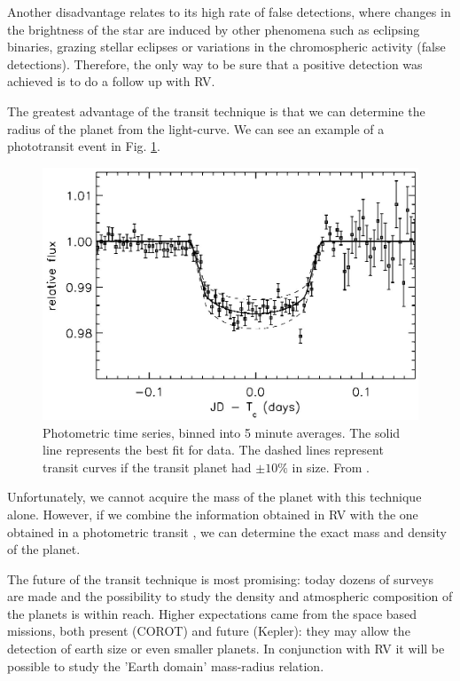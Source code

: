 \documentclass[dvips,12pt,a4paper]{report}
\begin{document}
Another disadvantage relates to its high rate of false detections, where changes in the brightness of the star are induced by other phenomena such as eclipsing binaries, grazing stellar eclipses or variations in the chromospheric activity (false detections). Therefore, the only way to be sure that a positive detection was achieved is to do a follow up with RV. 

The greatest advantage of the transit technique is that we can determine the radius of the planet from the light-curve. We can see an example of a phototransit event in Fig. \ref{photot}. 

\begin{figure}[h]
\centering
\includegraphics[trim=0cm 0.5cm 0cm 0.4cm,clip,height=5 cm]{pics/phototransit}
\caption[Example of a phototransit event]{Photometric time series, binned into 5 minute averages. The solid line represents the best fit for data. The dashed lines represent transit curves if the transit planet had $\pm10\%$ in size. From \citet{Charbonneau-2000}.}
\label{photot}
\end{figure}

Unfortunately, we cannot acquire the mass of the planet with this technique alone. However, if we combine the information obtained in RV with the one obtained in a photometric transit \citep{Charbonneau-2000}, we can determine the exact mass and density of the planet.


The future of the transit technique is most promising: today dozens of surveys are made and the possibility to study the density and atmospheric composition of the planets is within reach. Higher expectations came from the space based missions, both present (COROT) and future (Kepler): they may allow the detection of earth size or even smaller planets. In conjunction with RV it will be possible to study the 'Earth domain' mass-radius relation.
\end{document}
